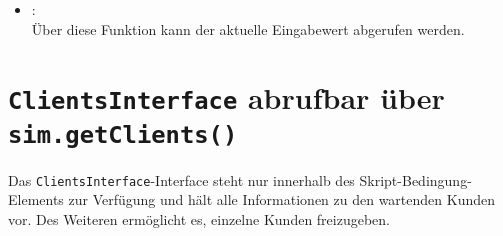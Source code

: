 \begin{itemize}
\item
{}:\\
Über diese Funktion kann der aktuelle Eingabewert abgerufen werden.
\end{itemize}



\chapter{\texttt{ClientsInterface} abrufbar über \texttt{sim.getClients()}}

Das \texttt{ClientsInterface}-Interface steht nur innerhalb des Skript-Bedingung-Elements zur Verfügung
und hält alle Informationen zu den wartenden Kunden vor. Des Weiteren ermöglicht es, einzelne Kunden freizugeben.

